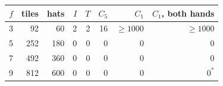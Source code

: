 \begin{tabular}{@{}rrrrrrrr@{}}
\toprule
$f$ & tiles & hats & $I$ & $T$ & $C_5$ & $C_1$ & $C_1$, both hands \\
\midrule
3 & 92 & 60 & 2 & 2 & 16 & $\ge1000$ & $\ge1000$ \\
5 & 252 & 180 & 0 & 0 & 0 & 0 & 0 \\
7 & 492 & 360 & 0 & 0 & 0 & 0 & 0 \\
9 & 812 & 600 & 0 & 0 & 0 & 0 & $0^{*}$ \\
\bottomrule
\end{tabular}
